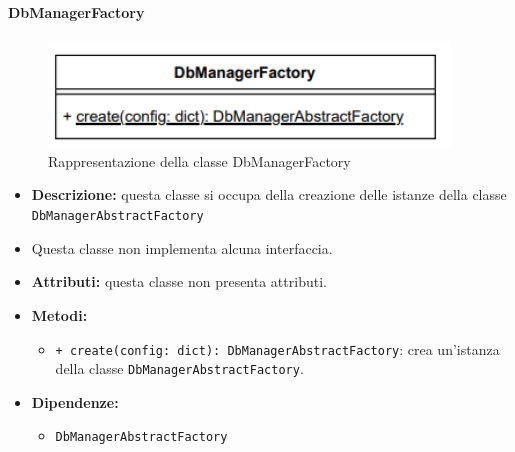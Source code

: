 \paragraph{DbManagerFactory} \label{DbManagerFactory}
\begin{figure}[H]
    \centering
    \includegraphics[width=0.95\textwidth]{assets/Backend/db_manager_factory.png}
    \caption{Rappresentazione della classe DbManagerFactory}
  \end{figure}
\begin{itemize}
    \item \textbf{Descrizione:} questa classe si occupa della creazione delle istanze della classe \texttt{DbManagerAbstractFactory} 
    \item Questa classe non implementa alcuna interfaccia.
    \item \textbf{Attributi:} questa classe non presenta attributi.
    \item \textbf{Metodi:}
    \begin{itemize}
        \item \texttt{+ create(config: dict): DbManagerAbstractFactory}: crea un'istanza della classe \texttt{DbManagerAbstractFactory}.
    \end{itemize}
    \item \textbf{Dipendenze:}
    \begin{itemize}
        \item \texttt{DbManagerAbstractFactory}
    \end{itemize}
\end{itemize}


